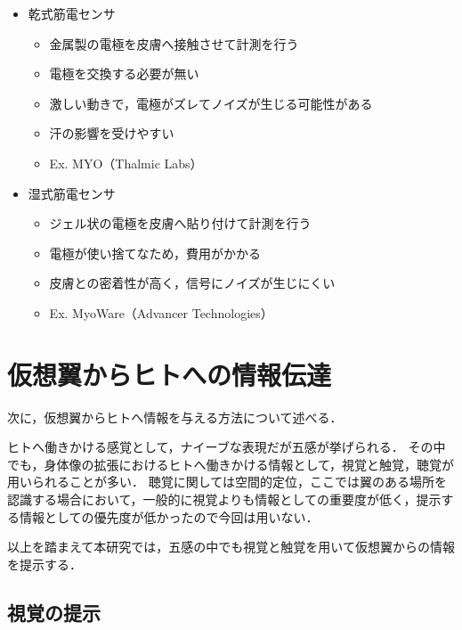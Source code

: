         \begin{itemize}
        \item 乾式筋電センサ
            \begin{itemize}
            \item 金属製の電極を皮膚へ接触させて計測を行う
            \item 電極を交換する必要が無い
            \item 激しい動きで，電極がズレてノイズが生じる可能性がある
            \item 汗の影響を受けやすい
            \item Ex. MYO（Thalmic Labs）
            \end{itemize}

        \item 湿式筋電センサ
            \begin{itemize}
            \item ジェル状の電極を皮膚へ貼り付けて計測を行う
            \item 電極が使い捨てなため，費用がかかる
            \item 皮膚との密着性が高く，信号にノイズが生じにくい
            \item Ex. MyoWare（Advancer Technologies）
            \end{itemize}
        \end{itemize}

    
\section{仮想翼からヒトへの情報伝達}
    次に，仮想翼からヒトへ情報を与える方法について述べる．

    ヒトへ働きかける感覚として，ナイーブな表現だが五感が挙げられる．
    その中でも，身体像の拡張におけるヒトへ働きかける情報として，視覚と触覚，聴覚が用いられることが多い．
    聴覚に関しては空間的定位，ここでは翼のある場所を認識する場合において，一般的に視覚よりも情報としての重要度が低く\cite{岡嶋克典20182}，提示する情報としての優先度が低かったので今回は用いない．
    
    以上を踏まえて本研究では，五感の中でも視覚と触覚を用いて仮想翼からの情報を提示する．

    \subsection{視覚の提示}
        
